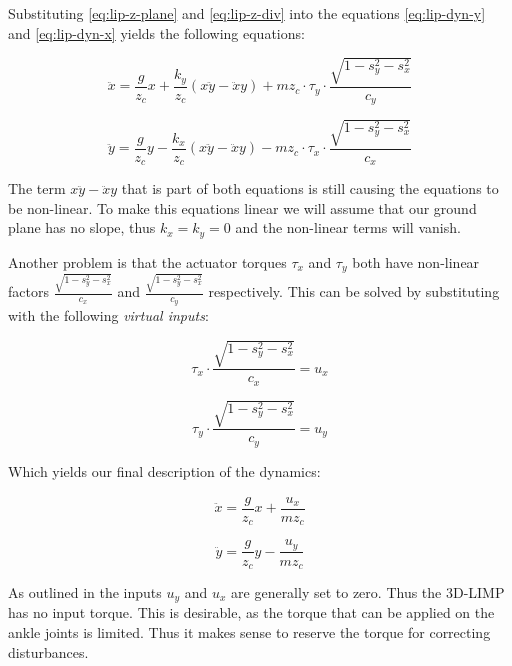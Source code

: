 \documentclass[english,ngerman]{KITreprt}
\begin{document}
Substituting \ref{eq:lip-z-plane} and \ref{eq:lip-z-div} into the
equations \ref{eq:lip-dyn-y} and \ref{eq:lip-dyn-x} yields the following
equations:

\begin{equation}
\ddot{x} = \frac{g}{z_c} x + \frac{k_y}{z_c} (x\ddot{y} - \ddot{x}y) + m z_c \cdot \tau_y \cdot \frac{\sqrt{1 - s_y^2 - s_x^2}}{c_y}
\end{equation}

\begin{equation}
\ddot{y} = \frac{g}{z_c} y - \frac{k_x}{z_c} (x\ddot{y} - \ddot{x}y) - m z_c \cdot \tau_x \cdot \frac{\sqrt{1 - s_y^2 - s_x^2}}{c_x}
\end{equation}

The term $x\ddot{y} - \ddot{x}y$ that is part of both equations is still
causing the equations to be non-linear. To make this equations linear we
will assume that our ground plane has no slope, thus $k_x = k_y = 0$ and
the non-linear terms will vanish.

Another problem is that the actuator torques $\tau_x$ and $\tau_y$ both
have non-linear factors $\frac{\sqrt{1 - s_y^2 - s_x^2}}{c_x}$ and
$\frac{\sqrt{1 - s_y^2 - s_x^2}}{c_y}$ respectively. This can be solved
by substituting with the following \emph{virtual inputs}:

\begin{equation}
\tau_x \cdot \frac{\sqrt{1 - s_y^2 - s_x^2}}{c_x} = u_x
\end{equation}

\begin{equation}
\tau_y \cdot \frac{\sqrt{1 - s_y^2 - s_x^2}}{c_y} = u_y
\end{equation}

Which yields our final description of the dynamics:

\begin{equation} \label{eq:lip-x}
\ddot{x} = \frac{g}{z_c} x + \frac{u_x}{m z_c}
\end{equation}

\begin{equation} \label{eq:lip-y}
\ddot{y} = \frac{g}{z_c} y - \frac{u_y}{m z_c}
\end{equation}

As outlined in \cite{kajita20013d} the inputs $u_y$ and $u_x$ are
generally set to zero. Thus the 3D-LIMP has no input torque. This is
desirable, as the torque that can be applied on the ankle joints is
limited. Thus it makes sense to reserve the torque for correcting
disturbances.
\end{document}
